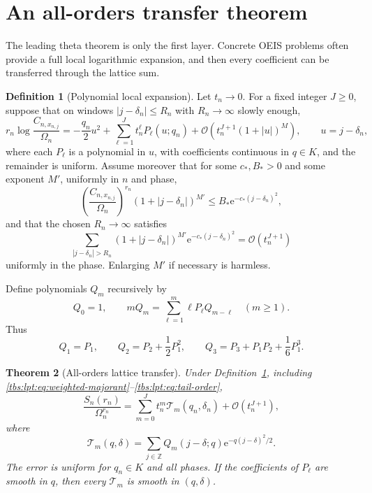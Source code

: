 \documentclass[11pt,a4paper]{article}
\numberwithin{equation}{section}
\newtheorem{theorem}{Theorem}[section]
\theoremstyle{definition}
\newtheorem{definition}[theorem]{Definition}
\newcommand{\Z}{\mathbb Z}
\newcommand{\ee}{\mathrm e}
\newcommand{\OO}{\mathcal O}
\begin{document}
\section{An all-orders transfer theorem}\label{tbs:lpt:sec:allorders}

The leading theta theorem is only the first layer. Concrete OEIS problems
often provide a full local logarithmic expansion, and then every
coefficient can be transferred through the lattice sum.

\begin{definition}[Polynomial local expansion]\label{tbs:lpt:def:polyexp}
Let $t_n\to0$. For a fixed integer $J\ge0$, suppose that on windows
$|j-\delta_n|\le R_n$ with $R_n\to\infty$ slowly enough,
\begin{equation}\label{tbs:lpt:eq:powered-expansion}
 r_n\log\frac{C_{n,x_{n,j}}}{\Omega_n}
 =-\frac{q_n}{2}u^2+\sum_{\ell=1}^{J}t_n^\ell P_\ell(u;q_n)
 +\OO\!\left(t_n^{J+1}(1+|u|)^M\right),
 \qquad u=j-\delta_n,
\end{equation}
where each $P_\ell$ is a polynomial in $u$, with coefficients continuous
in $q\in K$, and the remainder is uniform. Assume moreover that for some
$c_*,B_*>0$ and some exponent $M'$, uniformly in $n$ and phase,
\begin{equation}\label{tbs:lpt:eq:weighted-majorant}
 \left(\frac{C_{n,x_{n,j}}}{\Omega_n}\right)^{r_n}(1+|j-\delta_n|)^{M'}
 \le B_*\ee^{-c_*(j-\delta_n)^2},
\end{equation}
and that the chosen $R_n\to\infty$ satisfies
\begin{equation}\label{tbs:lpt:eq:tail-order}
 \sum_{|j-\delta_n|>R_n}(1+|j-\delta_n|)^{M'}
       \ee^{-c_*(j-\delta_n)^2}=\OO(t_n^{J+1})
\end{equation}
uniformly in the phase. Enlarging $M'$ if necessary is harmless.
\end{definition}

Define polynomials $Q_m$ recursively by
\begin{equation}\label{tbs:lpt:eq:bell-rec}
 Q_0=1,\qquad
 mQ_m=\sum_{\ell=1}^{m}\ell P_\ell Q_{m-\ell}\quad(m\ge1).
\end{equation}
Thus
\[
 Q_1=P_1,\qquad Q_2=P_2+\frac12P_1^2,\qquad
 Q_3=P_3+P_1P_2+\frac16P_1^3.
\]

\begin{theorem}[All-orders lattice transfer]\label{tbs:lpt:thm:allorders}
Under Definition~\ref{tbs:lpt:def:polyexp}, including
\eqref{tbs:lpt:eq:weighted-majorant}--\eqref{tbs:lpt:eq:tail-order},
\begin{equation}\label{tbs:lpt:eq:allorders}
 \frac{S_n(r_n)}{\Omega_n^{r_n}}
 =\sum_{m=0}^{J}t_n^m\mathcal T_m(q_n,\delta_n)
 +\OO(t_n^{J+1}),
\end{equation}
where
\begin{equation}\label{tbs:lpt:eq:T_m}
 \mathcal T_m(q,\delta)=\sum_{j\in\Z}
 Q_m(j-\delta;q)\ee^{-q(j-\delta)^2/2}.
\end{equation}
The error is uniform for $q_n\in K$ and all phases. If the coefficients
of $P_\ell$ are smooth in $q$, then every $\mathcal T_m$ is smooth in
$(q,\delta)$.
\end{theorem}
\end{document}
